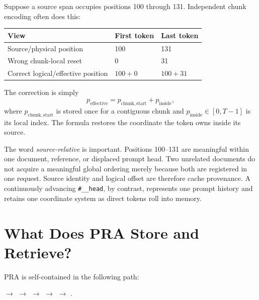 \documentclass[11pt]{article}
\begin{document}
Suppose a source span occupies positions 100 through 131. Independent chunk encoding often
does this:

\begin{center}
\begin{tabular}{lll}
\toprule
View & First token & Last token \\
\midrule
Source/physical position & 100 & 131 \\
Wrong chunk-local reset & 0 & 31 \\
Correct logical/effective position & $100+0$ & $100+31$ \\
\bottomrule
\end{tabular}
\end{center}

The correction is simply
\begin{equation}
  p_{\mathrm{effective}} = p_{\mathrm{chunk,start}} + p_{\mathrm{inside}},
  \label{eq:logical-position}
\end{equation}
where $p_{\mathrm{chunk,start}}$ is stored once for a contiguous chunk and
$p_{\mathrm{inside}}\in[0,T-1]$ is its local index. The formula restores the coordinate the
token owns inside its source.

The word \emph{source-relative} is important. Positions 100--131 are meaningful within one
document, reference, or displaced prompt head. Two unrelated documents do not acquire a
meaningful global ordering merely because both are registered in one request. Source identity
and logical offset are therefore cache provenance. A continuously advancing
\texttt{\#\_\_head}, by contrast, represents one prompt history and retains one coordinate
system as direct tokens roll into memory.

\section{What Does PRA Store and Retrieve?}
\label{sec:pra}

PRA is self-contained in the following path:

\begin{center}
\setlength{\fboxsep}{5pt}
$\rightarrow$ 
$\rightarrow$ 
$\rightarrow$ 
$\rightarrow$ 
$\rightarrow$ .
\end{center}
\end{document}
